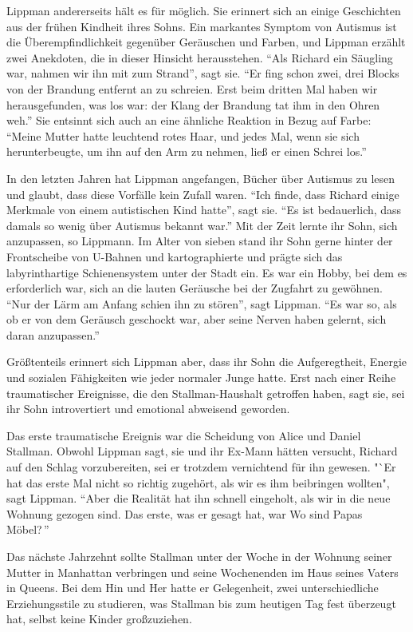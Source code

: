 Lippman andererseits hält es für möglich. Sie erinnert sich an einige Geschichten aus der frühen Kindheit ihres Sohns. Ein markantes Symptom von Autismus ist die Überempfindlichkeit gegenüber Geräuschen und Farben, und Lippman erzählt zwei Anekdoten, die in dieser Hinsicht herausstehen. "`Als Richard ein Säugling war, nahmen wir ihn mit zum Strand"', sagt sie. "`Er fing schon zwei, drei Blocks von der Brandung entfernt an zu schreien. Erst beim dritten Mal haben wir herausgefunden, was los war: der Klang der Brandung tat ihm in den Ohren weh."' Sie entsinnt sich auch an eine ähnliche Reaktion in Bezug auf Farbe: "`Meine Mutter hatte leuchtend rotes Haar, und jedes Mal, wenn sie sich herunterbeugte, um ihn auf den Arm zu nehmen, ließ er einen Schrei los."'

In den letzten Jahren hat Lippman angefangen, Bücher über Autismus zu lesen und glaubt, dass diese Vorfälle kein Zufall waren. "`Ich finde, dass Richard einige Merkmale von einem autistischen Kind hatte"', sagt sie. "`Es ist bedauerlich, dass damals so wenig über Autismus bekannt war."'
Mit der Zeit lernte ihr Sohn, sich anzupassen, so Lippmann. Im Alter von sieben stand ihr Sohn gerne hinter der Frontscheibe von U-Bahnen und kartographierte und prägte sich das labyrinthartige Schienensystem unter der Stadt ein. Es war ein Hobby, bei dem es erforderlich war, sich an die lauten Geräusche bei der Zugfahrt zu gewöhnen. "`Nur der Lärm am Anfang schien ihn zu stören"', sagt Lippman. "`Es war so, als ob er von dem Geräusch geschockt war, aber seine Nerven haben gelernt, sich daran anzupassen."'

Größtenteils erinnert sich Lippman aber, dass ihr Sohn die Aufgeregtheit, Energie und sozialen Fähigkeiten wie jeder normaler Junge hatte. Erst nach einer Reihe traumatischer Ereignisse, die den Stallman-Haushalt getroffen haben, sagt sie, sei ihr Sohn introvertiert und emotional abweisend geworden.

Das erste traumatische Ereignis war die Scheidung von Alice und Daniel Stallman. Obwohl Lippman sagt, sie und ihr Ex-Mann hätten versucht, Richard auf den Schlag vorzubereiten, sei er trotzdem vernichtend für ihn gewesen. "`Er hat das erste Mal nicht so richtig zugehört, als wir es ihm beibringen wollten", sagt Lippman. "`Aber die Realität hat ihn schnell eingeholt, als wir in die neue Wohnung gezogen sind. Das erste, was er gesagt hat, war \glq Wo sind Papas Möbel?{}\grq\,"'

Das nächste Jahrzehnt sollte Stallman unter der Woche in der Wohnung seiner Mutter in Manhattan verbringen und seine Wochenenden im Haus seines Vaters in Queens. Bei dem Hin und Her hatte er Gelegenheit, zwei unterschiedliche Erziehungsstile zu studieren, was Stallman bis zum heutigen Tag fest überzeugt hat, selbst keine Kinder großzuziehen. 

